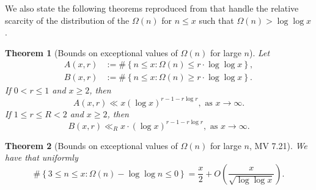 \documentclass[11pt,reqno,a4letter]{article}
\numberwithin{figure}{section}
\numberwithin{table}{section}
\theoremstyle{plain}
\newtheorem{theorem}{Theorem}
\numberwithin{theorem}{section}
\theoremstyle{definition}
\begin{document}
We also state the following theorems reproduced from \cite[\S 7.4]{MV} that handle the relative 
scarcity of the distribution of the $\Omega(n)$ for $n \leq x$ such that 
$\Omega(n) > \log\log x$. 

\begin{theorem}[Bounds on exceptional values of $\Omega(n)$ for large $n$] 
\label{theorem_MV_Thm7.20-init_stmt} 
Let 
\begin{align*} 
A(x, r) & := \#\left\{n \leq x: \Omega(n) \leq r \cdot \log\log x\right\}, \\ 
B(x, r) & := \#\left\{n \leq x: \Omega(n) \geq r \cdot \log\log x\right\}. 
\end{align*} 
If $0 < r \leq 1$ and $x \geq 2$, then 
\[
A(x, r) \ll x (\log x)^{r-1 - r\log r}, \text{ \ as\ } x \rightarrow \infty. 
\]
If $1 \leq r \leq R < 2$ and $x \geq 2$, then 
\[
B(x, r) \ll_R x \cdot (\log x)^{r-1-r \log r}, \text{ \ as\ } x \rightarrow \infty. 
\]
\end{theorem} 

\begin{theorem}[Bounds on exceptional values of $\Omega(n)$ for large $n$, MV 7.21] 
\label{theorem_MV_Thm7.21-init_stmt} 
We have that uniformly 
\[
\#\left\{3 \leq n \leq x: \Omega(n) - \log\log n \leq 0\right\} = 
     \frac{x}{2} + O\left(\frac{x}{\sqrt{\log\log x}}\right). 
\]
\end{theorem} 
\end{document}
